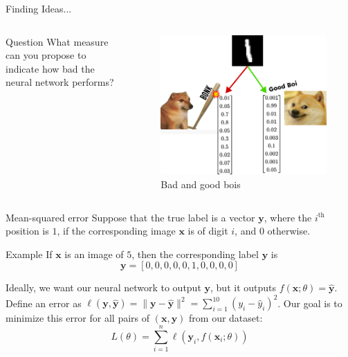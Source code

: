 \documentclass{beamer}
\begin{document}
    \begin{frame}{Finding Ideas...}
        \begin{columns}
        \begin{column}{0.35\textwidth}
        \begin{exampleblock}{Question}
            What measure can you propose to indicate how bad the neural network performs?
        \end{exampleblock}
        \end{column}
        \begin{column}{0.65\textwidth}
        \begin{figure}
        \centering
            \includegraphics[width=\textwidth]{images/presentation/loss.png}
            \caption{Bad and good bois}
        \end{figure}
        \end{column}
        \end{columns}
    \end{frame}

    \begin{frame}{Mean-squared error}
        Suppose that the true label is a vector $\mathbf{y}$, where the $i^{\text{th}}$ position is $1$, if the corresponding image $\mathbf{x}$ is of digit $i$, and $0$ otherwise.

        \begin{exampleblock}{Example}
            If $\mathbf{x}$ is an image of $5$, then the corresponding label $\mathbf{y}$ is
            \[
            \mathbf{y} = [0, 0, 0, 0, 0, 1, 0, 0, 0, 0]
            \]
        \end{exampleblock}

        Ideally, we want our neural network to output $\mathbf{y}$, but it outputs $f(\mathbf{x};\theta)=\hat{\mathbf{y}}$. Define an error as $\ell(\mathbf{y},\hat{\mathbf{y}}) = \|\mathbf{y}-\hat{\mathbf{y}}\|^2=\sum_{i=1}^{10}(y_i-\hat{y}_i)^2$. Our goal is to minimize this error for all pairs of $(\mathbf{x},\mathbf{y})$ from our dataset:
        \[
        \boxed{L(\theta) = \sum_{i=1}^n \ell(\mathbf{y}_i,f(\mathbf{x}_i;\theta))}
        \]
    \end{frame}
\end{document}
